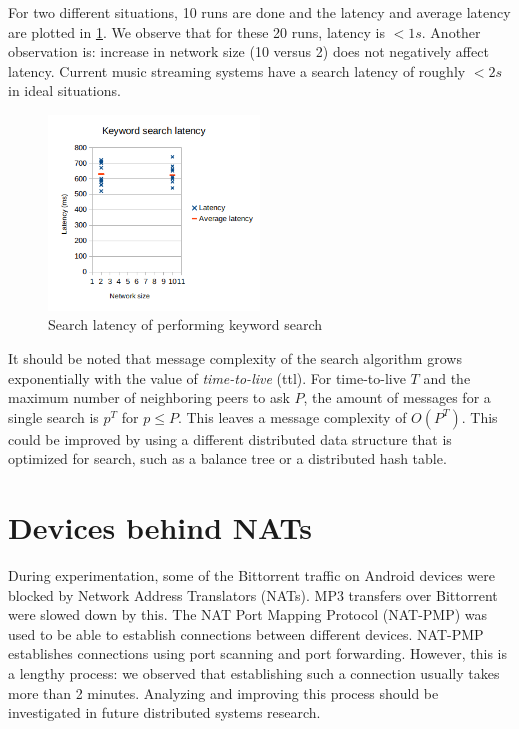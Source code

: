 For two different situations, 10 runs are done and the latency and average latency are plotted in \ref{fig:search-latency}. We observe that for these 20 runs, latency is $<1s$. Another observation is: increase in network size (10 versus 2) does not negatively affect latency. Current music streaming systems have a search latency of roughly $<2s$ in ideal situations.

\begin{figure}
    \centering
    \includegraphics[width=0.5\textwidth]{evaluation/search-latency.png}
    \caption{Search latency of performing keyword search}
    \label{fig:search-latency}
\end{figure}

It should be noted that message complexity of the search algorithm grows exponentially with the value of \textit{time-to-live} (ttl). For time-to-live $T$ and the maximum number of neighboring peers to ask $P$, the amount of messages for a single search is $p^T$ for $p\leq P$. This leaves a message complexity of $O(P^T)$. This could be improved by using a different distributed data structure that is optimized for search, such as a balance tree or a distributed hash table. 

\section{Devices behind NATs}
During experimentation, some of the Bittorrent traffic on Android devices were blocked by Network Address  Translators (NATs). MP3 transfers over Bittorrent were slowed down by this. The NAT Port Mapping Protocol (NAT-PMP) was used to be able to establish connections between different devices. NAT-PMP establishes connections using port scanning and port forwarding. However, this is a lengthy process: we observed that establishing such a connection usually takes more than 2 minutes. Analyzing and improving this process should be investigated in future distributed systems research.

